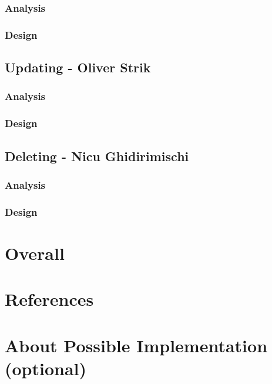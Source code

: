 \documentclass{article}
\begin{document}
\subsubsection*{Analysis}
\subsubsection*{Design}
\subsection*{Updating - Oliver Strik}
\subsubsection*{Analysis}
\subsubsection*{Design}
\subsection*{Deleting - Nicu Ghidirimischi}
\subsubsection*{Analysis}
\subsubsection*{Design}
\section*{Overall}
\section*{References}
\section*{About Possible Implementation (optional)}


\end{document}
